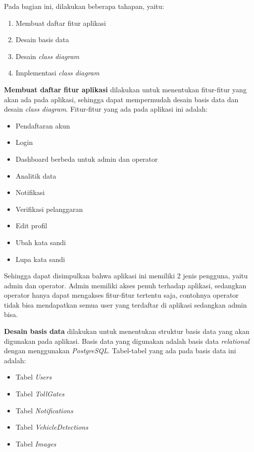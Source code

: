Pada bagian ini, dilakukan beberapa tahapan, yaitu:
\begin{enumerate}[nolistsep]
  \item Membuat daftar fitur aplikasi
  \item Desain basis data
  \item Desain \emph{class diagram}
  \item Implementasi \emph{class diagram}
\end{enumerate}

\textbf{Membuat daftar fitur aplikasi} dilakukan untuk menentukan fitur-fitur yang akan ada pada aplikasi, sehingga dapat mempermudah desain basis data dan desain \emph{class diagram}. Fitur-fitur yang ada pada aplikasi ini adalah:
\begin{itemize}[nolistsep]
  \item Pendaftaran akun
  \item Login
  \item Dashboard berbeda untuk admin dan operator
  \item Analitik data
  \item Notifikasi
  \item Verifikasi pelanggaran
  \item Edit profil
  \item Ubah kata sandi
  \item Lupa kata sandi
\end{itemize}

Sehingga dapat disimpulkan bahwa aplikasi ini memiliki 2 jenis pengguna, yaitu admin dan operator. Admin memiliki akses penuh terhadap aplikasi, sedangkan operator hanya dapat mengakses fitur-fitur tertentu saja, contohnya operator tidak bisa mendapatkan semua user yang terdaftar di aplikasi sedangkan admin bisa.

\textbf{Desain basis data} dilakukan untuk menentukan struktur basis data yang akan digunakan pada aplikasi. Basis data yang digunakan adalah basis data \emph{relational} dengan menggunakan \emph{PostgreSQL}. Tabel-tabel yang ada pada basis data ini adalah:
\begin{itemize}[nolistsep]
  \item Tabel \emph{Users}
  \item Tabel \emph{TollGates}
  \item Tabel \emph{Notifications}
  \item Tabel \emph{VehicleDetections}
  \item Tabel \emph{Images}
\end{itemize}

